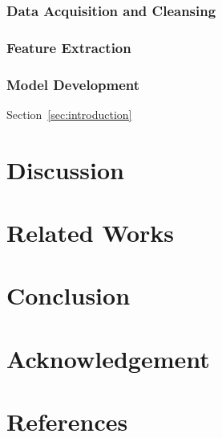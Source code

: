\documentclass[letterpaper]{article} %
\begin{document}
\subsubsection{Data Acquisition and Cleansing}
\label{sec:data-cleansing}

\subsubsection{Feature Extraction}
\label{sec:feature-extraction}

\subsubsection{Model Development}
\label{sec:model-development}

Section~\ref{sec:introduction}


\section{Discussion}

\section{Related Works}



\section{Conclusion}

\section{Acknowledgement}

\section{References}


\end{document}
